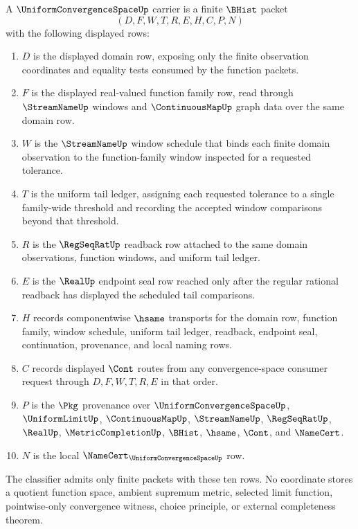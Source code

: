 \begin{definition}\label{def:uniform-convergence-space-carrier}
A $\UniformConvergenceSpaceUp$ carrier is a finite $\BHist$ packet
$$
(D,F,W,T,R,E,H,C,P,N)
$$
with the following displayed rows:
\begin{enumerate}
\item $D$ is the displayed domain row, exposing only the finite observation coordinates and equality tests consumed by the function packets.
\item $F$ is the displayed real-valued function family row, read through $\StreamNameUp$ windows and $\ContinuousMapUp$ graph data over the same domain row.
\item $W$ is the $\StreamNameUp$ window schedule that binds each finite domain observation to the function-family window inspected for a requested tolerance.
\item $T$ is the uniform tail ledger, assigning each requested tolerance to a single family-wide threshold and recording the accepted window comparisons beyond that threshold.
\item $R$ is the $\RegSeqRatUp$ readback row attached to the same domain observations, function windows, and uniform tail ledger.
\item $E$ is the $\RealUp$ endpoint seal row reached only after the regular rational readback has displayed the scheduled tail comparisons.
\item $H$ records componentwise $\hsame$ transports for the domain row, function family, window schedule, uniform tail ledger, readback, endpoint seal, continuation, provenance, and local naming rows.
\item $C$ records displayed $\Cont$ routes from any convergence-space consumer request through $D,F,W,T,R,E$ in that order.
\item $P$ is the $\Pkg$ provenance over $\UniformConvergenceSpaceUp$, $\UniformLimitUp$, $\ContinuousMapUp$, $\StreamNameUp$, $\RegSeqRatUp$, $\RealUp$, $\MetricCompletionUp$, $\BHist$, $\hsame$, $\Cont$, and $\NameCert$.
\item $N$ is the local $\NameCert_{\UniformConvergenceSpaceUp}$ row.
\end{enumerate}
The classifier admits only finite packets with these ten rows. No coordinate stores a quotient function space, ambient supremum metric, selected limit function, pointwise-only convergence witness, choice principle, or external completeness theorem.
\end{definition}

